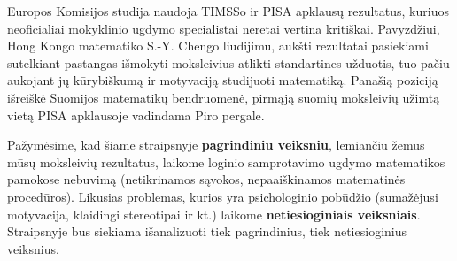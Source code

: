 \documentclass{article}
\begin{document}
Europos Komisijos studija naudoja TIMSSo ir PISA apklausų rezultatus, kuriuos neoficialiai mokyklinio ugdymo specialistai neretai vertina kritiškai. Pavyzdžiui, Hong Kongo matematiko S.-Y. Chengo liudijimu, aukšti rezultatai pasiekiami sutelkiant pastangas išmokyti moksleivius atlikti standartines užduotis, tuo pačiu aukojant jų kūrybiškumą ir motyvaciją studijuoti matematiką. Panašią poziciją išreiškė Suomijos matematikų bendruomenė, pirmąją suomių moksleivių užimtą vietą PISA apklausoje vadindama Piro pergale. 

Pažymėsime, kad šiame straipsnyje \textbf{pagrindiniu veiksniu}, lemiančiu žemus mūsų moksleivių rezultatus, laikome loginio samprotavimo ugdymo matematikos pamokose nebuvimą (netikrinamos sąvokos, nepaaiškinamos matematinės procedūros). Likusias problemas, kurios yra psichologinio pobūdžio (sumažėjusi motyvacija, klaidingi stereotipai ir kt.) laikome \textbf{netiesioginiais veiksniais}. Straipsnyje bus siekiama išanalizuoti tiek pagrindinius, tiek netiesioginius veiksnius.
\end{document}
